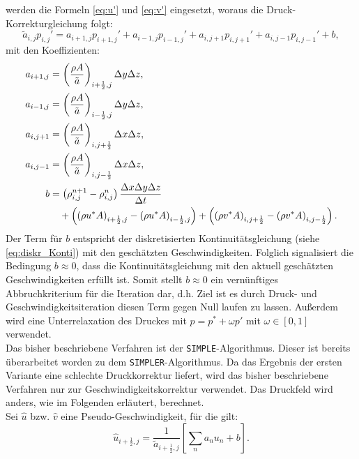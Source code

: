 werden die Formeln \eqref{eq:u'} und \eqref{eq:v'} eingesetzt, woraus die Druck-Korrekturgleichung folgt:
\begin{equation} \label{eq:druckkorrekturglg}
\tilde{a}_{i,j} p_{i,j}' = a_{i+1,j} p_{i+1,j}'+a_{i-1,j} p_{i-1,j}'+a_{i,j+1} p_{i,j+1}'+a_{i,j-1} p_{i,j-1}'+b,
\end{equation}
mit den Koeffizienten:
\begin{align}
a_{i+1,j}&=\left(\dfrac{\rho A}{\tilde{a}}\right)_{i+\frac{1}{2},j}\Delta y\Delta z, \\
a_{i-1,j}&=\left(\dfrac{\rho A}{\tilde{a}}\right)_{i-\frac{1}{2},j}\Delta y\Delta z, \\
a_{i,j+1}&=\left(\dfrac{\rho A}{\tilde{a}}\right)_{i,j+\frac{1}{2}}\Delta x\Delta z, \\
a_{i,j-1}&=\left(\dfrac{\rho A}{\tilde{a}}\right)_{i,j-\frac{1}{2}}\Delta x\Delta z, \\
b &= \left(\rho_{i,j}^{n+1}-\rho_{i,j}^{n}\right)\dfrac{\Delta x\Delta y\Delta z}{\Delta t} \notag \\
& \quad +  \left(\left(\rho u^{*} A\right)_{i+\frac{1}{2},j}-\left(\rho u^{*} A\right)_{i-\frac{1}{2},j}\right) + \left(\left(\rho v^{*} A\right)_{i,j+\frac{1}{2}}-\left(\rho v^{*} A\right)_{i,j-\frac{1}{2}}\right). \label{eq:b}
\end{align}
Der Term f\"ur $b$ entspricht der diskretisierten Kontinuit\"atsgleichung (siehe \eqref{eq:diskr_Konti}) mit den gesch\"atzten Geschwindigkeiten. Folglich signalisiert die Bedingung $b\approx0$, dass die Kontinuit\"atsgleichung mit den aktuell gesch\"atzten Geschwindigkeiten erf\"ullt ist. Somit stellt $b\approx0$ ein vern\"unftiges Abbruchkriterium f\"ur die Iteration dar, d.h. Ziel ist es durch Druck- und Geschwindigkeitsiteration diesen Term gegen Null laufen zu lassen. Au\ss{}erdem wird eine Unterrelaxation des Druckes mit $p=p^{*}+\omega p'$ mit $\omega\in[0,1]$ verwendet. \\ [0.5cm]
Das bisher beschriebene Verfahren ist der \texttt{SIMPLE}-Algorithmus. Dieser ist bereits \"uberarbeitet worden zu dem \texttt{SIMPLER}-Algorithmus. Da das Ergebnis der ersten Variante eine schlechte Druckkorrektur liefert, wird das bisher beschriebene Verfahren nur zur Geschwindigkeitskorrektur verwendet. Das Druckfeld wird anders, wie im Folgenden erl\"autert, berechnet. \\
Sei $\hat{u}$ bzw. $\hat{v}$ eine Pseudo-Geschwindigkeit, f\"ur die gilt:
\begin{equation} \label{eq:pseudo_geschw}
\hat{u}_{i+\frac{1}{2},j}=\dfrac{1}{\tilde{a}_{i+\frac{1}{2},j}}\left[\sum\limits_{n}a_{n}u_{n}+b\right].
\end{equation}
